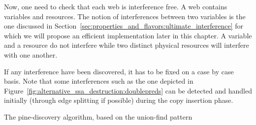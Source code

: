 Now, one need to check that each web is interference free. A web contains variables and resources. The notion of interferences between two variables is the one discussed in Section~\ref{sec:properties_and_flavors:ultimate_interference} for which we will propose an efficient implementation later in this chapter. A variable and a resource do not interfere while two distinct physical resources will interfere with one another.

If any interference have been discovered, it has to be fixed on a case by case basis. Note that some interferences such as the one depicted in Figure~\ref{fig:alternative_ssa_destruction:doublepreds} can be detected and handled initially (through edge splitting if possible) during the copy insertion phase.


\begin{algorithm}
\caption{\label{alg:alternative_ssadestruction_algorithm:find-webs}The pine-\phiwebs discovery algorithm, based on the union-find pattern}
\end{algorithm}
